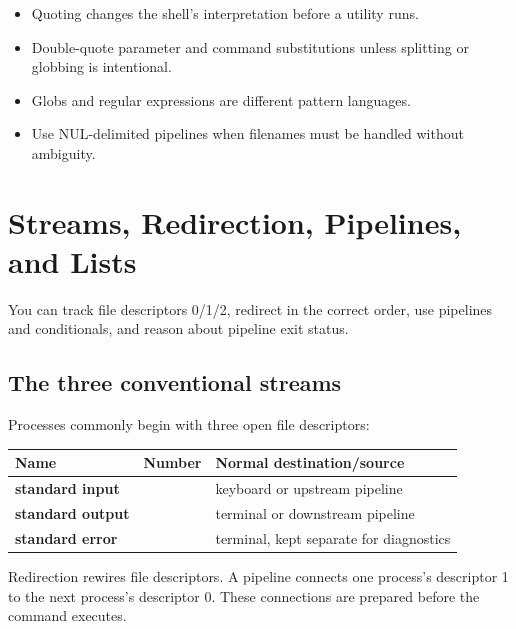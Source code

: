 \documentclass[11pt,oneside,openany]{book}
\newcommand{\chaptergoals}[1]{%
  \begin{tcolorbox}[colback=Paper,colframe=Blue,title={Learning outcomes},fonttitle=\bfseries]
  #1
  \end{tcolorbox}}
\begin{document}
\begin{recapbox}
\begin{itemize}
  \item Quoting changes the shell's interpretation before a utility runs.
  \item Double-quote parameter and command substitutions unless splitting or globbing is intentional.
  \item Globs and regular expressions are different pattern languages.
  \item Use NUL-delimited pipelines when filenames must be handled without ambiguity.
\end{itemize}
\end{recapbox}

\chapter{Streams, Redirection, Pipelines, and Lists}
\chaptergoals{You can track file descriptors 0/1/2, redirect in the correct order, use pipelines and conditionals, and reason about pipeline exit status.}

\section{The three conventional streams}
Processes commonly begin with three open file descriptors:
\begin{center}
\begin{tabularx}{0.9\textwidth}{>{\bfseries}p{}>{\ttfamily}p{}X}
\toprule
Name & Number & Normal destination/source \\
\midrule
standard input & 0 & keyboard or upstream pipeline \\
standard output & 1 & terminal or downstream pipeline \\
standard error & 2 & terminal, kept separate for diagnostics \\
\bottomrule
\end{tabularx}
\end{center}

\begin{mentalmodel}
Redirection rewires file descriptors. A pipeline connects one process's descriptor 1 to the next process's descriptor 0. These connections are prepared before the command executes.
\end{mentalmodel}
\end{document}
